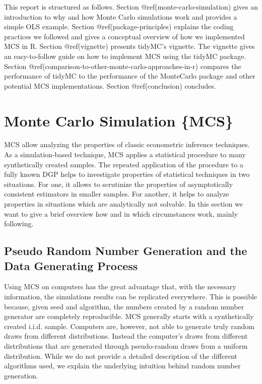 \documentclass[10pt,a4paper]{article}
\begin{document}
 This report is structured as follows. Section
 @ref(monte-carlo-simulation) gives an introduction to why and how Monte
 Carlo simulations work and provides a simple OLS example. Section
 @ref(package-principles) explains the coding practices we followed and
 gives a conceptual overview of how we implemented MCS in R. Section
 @ref(vignette) presents tidyMC's vignette. The vignette gives an
 easy-to-follow guide on how to implement MCS using the tidyMC package.
 Section @ref(comparison-to-other-monte-carlo-approaches-in-r) compares
 the performance of tidyMC to the performance of the MonteCarlo package
 and other potential MCS implementations. Section @ref(conclusion)
 concludes.

 \hypertarget{monte-carlo-simulation-mcs}{%
 \section{Monte Carlo Simulation
 \{MCS\}}\label{monte-carlo-simulation-mcs}}

 MCS allow analyzing the properties of classic econometric inference
 techniques. As a simulation-based technique, MCS applies a statistical
 procedure to many synthetically created samples. The repeated
 application of the procedure to a fully known DGP helps to investigate
 properties of statistical techniques in two situations. For one, it
 allows to scrutinize the properties of asymptotically consistent
 estimators in smaller samples. For another, it helps to analyze
 properties in situations which are analytically not solvable. In this
 section we want to give a brief overview how and in which circumstances
 work, mainly following.

 \hypertarget{pseudo-random-number-generation-and-the-data-generating-process}{%
 \subsection{Pseudo Random Number Generation and the Data Generating
 Process}\label{pseudo-random-number-generation-and-the-data-generating-process}}

 Using MCS on computers has the great advantage that, with the necessary
 information, the simulations results can be replicated everywhere. This
 is possible because, given seed and algorithm, the numbers created by a
 random number generator are completely reproducible. MCS generally
 starts with a synthetically created i.i.d. sample. Computers are,
 however, not able to generate truly random draws from different
 distributions. Instead the computer's draws from different
 distributions that are generated through pseudo-random draws from a
 uniform distribution. While we do not provide a detailed description of
 the different algorithms used, we explain the underlying intuition
 behind random number generation.
\end{document}
